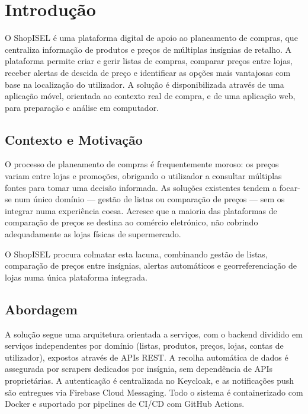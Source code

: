 
\chapter{Introdução}

O ShopISEL é uma plataforma digital de apoio ao planeamento de compras, que centraliza informação de produtos e preços de múltiplas insígnias de retalho. A plataforma permite criar e gerir listas de compras, comparar preços entre lojas, receber alertas de descida de preço e identificar as opções mais vantajosas com base na localização do utilizador. A solução é disponibilizada através de uma aplicação móvel, orientada ao contexto real de compra, e de uma aplicação web, para preparação e análise em computador.

\section{Contexto e Motivação}
\label{sec:1.1}

O processo de planeamento de compras é frequentemente moroso: os preços variam entre lojas e promoções, obrigando o utilizador a consultar múltiplas fontes para tomar uma decisão informada. As soluções existentes tendem a focar-se num único domínio — gestão de listas ou comparação de preços — sem os integrar numa experiência coesa. Acresce que a maioria das plataformas de comparação de preços se destina ao comércio eletrónico, não cobrindo adequadamente as lojas físicas de supermercado.

O ShopISEL procura colmatar esta lacuna, combinando gestão de listas, comparação de preços entre insígnias, alertas automáticos e georreferenciação de lojas numa única plataforma integrada.

\section{Abordagem}
\label{sec:1.2}

A solução segue uma arquitetura orientada a serviços, com o backend dividido em serviços independentes por domínio (listas, produtos, preços, lojas, contas de utilizador), expostos através de \ac{API}s REST. A recolha automática de dados é assegurada por scrapers dedicados por insígnia, sem dependência de \ac{API}s proprietárias. A autenticação é centralizada no Keycloak, e as notificações push são entregues via Firebase Cloud Messaging. Todo o sistema é containerizado com Docker e suportado por pipelines de \ac{CI/CD} com GitHub Actions.

